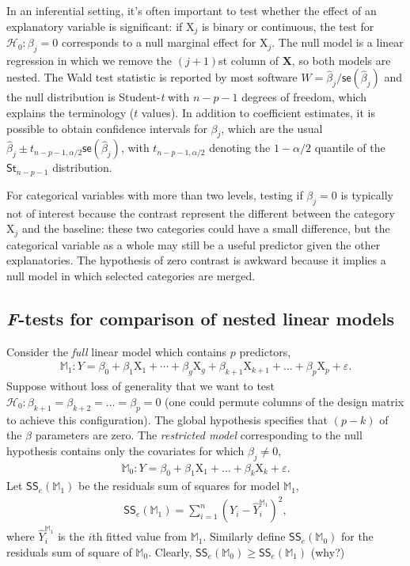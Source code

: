\documentclass[
  11pt,
  letterpaper,
]{book}
\theoremstyle{definition}
\theoremstyle{definition}
\theoremstyle{definition}
\theoremstyle{remark}
\begin{document}
In an inferential setting, it's often important to test whether the effect of an explanatory variable is significant: if \(\mathrm{X}_j\) is binary or continuous, the test for \(\mathscr{H}_0: \beta_j=0\) corresponds to a null marginal effect for \(\mathrm{X}_j\). The null model is a linear regression in which we remove the \((j+1)\)st column of \(\mathbf{X}\), so both models are nested. The Wald test statistic is reported by most software \(W=\widehat{\beta}_j/\mathsf{se}(\widehat{\beta}_j)\) and the null distribution is Student-\emph{t} with \(n-p-1\) degrees of freedom, which explains the terminology (\(t\) values). In addition to coefficient estimates, it is possible to obtain confidence intervals for \(\beta_j\), which are the usual \(\widehat{\beta}_j \pm t_{n-p-1,\alpha/2} \mathsf{se}(\widehat{\beta}_j)\), with \(t_{n-p-1,\alpha/2}\) denoting the \(1-\alpha/2\) quantile of the \(\mathsf{St}_{n-p-1}\) distribution.

For categorical variables with more than two levels, testing if \(\beta_j=0\) is typically not of interest because the contrast represent the different between the category \(\mathrm{X}_j\) and the baseline: these two categories could have a small difference, but the categorical variable as a whole may still be a useful predictor given the other explanatories. The hypothesis of zero contrast is awkward because it implies a null model in which selected categories are merged.

\hypertarget{ftestslm}{%
\subsection{\texorpdfstring{\emph{F}-tests for comparison of nested linear models}{F-tests for comparison of nested linear models}}\label{ftestslm}}

Consider the \emph{full} linear model which contains \(p\) predictors,
\begin{align*}
\mathbb{M}_1: Y=\beta_0+\beta_1 \mathrm{X}_1 + \cdots + \beta_g \mathrm{X}_g + \beta_{k+1}\mathrm{X}_{k+1} + \ldots + \beta_p \mathrm{X}_p + \varepsilon.
\end{align*}
Suppose without loss of generality that we want to test \(\mathscr{H}_0: \beta_{k+1}=\beta_{k+2}=\ldots=\beta_p=0\) (one could permute columns of the design matrix to achieve this configuration).
The global hypothesis specifies that \((p-k)\) of the \(\beta\) parameters are zero. The \emph{restricted model} corresponding to the null hypothesis contains only the covariates for which \(\beta_j \neq 0\),
\begin{align*}
\mathbb{M}_0: Y=\beta_0+\beta_1 \mathrm{X}_1 + \ldots + \beta_k \mathrm{X}_k + \varepsilon.
\end{align*}
Let \(\mathsf{SS}_e(\mathbb{M}_1)\) be the residuals sum of squares for model \(\mathbb{M}_1\),
\begin{align*}
\mathsf{SS}_e(\mathbb{M}_1)=\sum_{i=1}^n (Y_i-\hat{Y}_i^{\mathbb{M}_1})^2,
\end{align*}
where \(\hat{Y}_i^{\mathbb{M}_1}\) is the \(i\)th fitted value from \(\mathbb{M}_1\). Similarly define \(\mathsf{SS}_e(\mathbb{M}_0)\) for the residuals sum of square of \(\mathbb{M}_0\). Clearly, \(\mathsf{SS}_e(\mathbb{M}_0) \geq \mathsf{SS}_e(\mathbb{M}_1)\) (why?)
\end{document}
